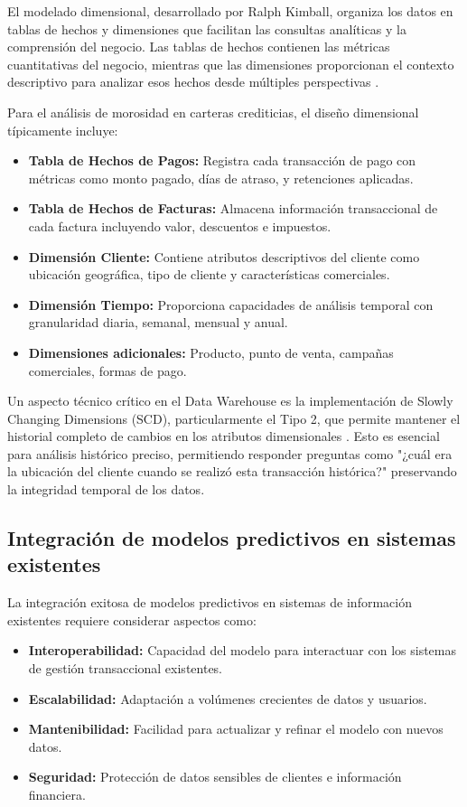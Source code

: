 El modelado dimensional, desarrollado por Ralph Kimball, organiza los datos en tablas de hechos y dimensiones que facilitan las consultas analíticas y la comprensión del negocio. Las tablas de hechos contienen las métricas cuantitativas del negocio, mientras que las dimensiones proporcionan el contexto descriptivo para analizar esos hechos desde múltiples perspectivas \citep{kimball2013toolkit}.

Para el análisis de morosidad en carteras crediticias, el diseño dimensional típicamente incluye:

\begin{itemize}
    \item \textbf{Tabla de Hechos de Pagos:} Registra cada transacción de pago con métricas como monto pagado, días de atraso, y retenciones aplicadas.
    \item \textbf{Tabla de Hechos de Facturas:} Almacena información transaccional de cada factura incluyendo valor, descuentos e impuestos.
    \item \textbf{Dimensión Cliente:} Contiene atributos descriptivos del cliente como ubicación geográfica, tipo de cliente y características comerciales.
    \item \textbf{Dimensión Tiempo:} Proporciona capacidades de análisis temporal con granularidad diaria, semanal, mensual y anual.
    \item \textbf{Dimensiones adicionales:} Producto, punto de venta, campañas comerciales, formas de pago.
\end{itemize}

Un aspecto técnico crítico en el Data Warehouse es la implementación de Slowly Changing Dimensions (SCD), particularmente el Tipo 2, que permite mantener el historial completo de cambios en los atributos dimensionales \citep{kimball2008scd}. Esto es esencial para análisis histórico preciso, permitiendo responder preguntas como "¿cuál era la ubicación del cliente cuando se realizó esta transacción histórica?" preservando la integridad temporal de los datos.

\subsection{Integración de modelos predictivos en sistemas existentes}
La integración exitosa de modelos predictivos en sistemas de información existentes requiere considerar aspectos como:

\begin{itemize}
    \item \textbf{Interoperabilidad:} Capacidad del modelo para interactuar con los sistemas de gestión transaccional existentes.
    \item \textbf{Escalabilidad:} Adaptación a volúmenes crecientes de datos y usuarios.
    \item \textbf{Mantenibilidad:} Facilidad para actualizar y refinar el modelo con nuevos datos.
    \item \textbf{Seguridad:} Protección de datos sensibles de clientes e información financiera.
\end{itemize}

